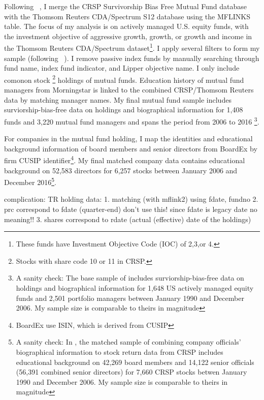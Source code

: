 \documentclass[11pt]{article}
\begin{document}
\begin{doublespace}
Following ~\cite{wermers2000mutual}, I merge the CRSP Survivorship Bias Free Mutual Fund database with the Thomsom Reuters CDA/Spectrum S12 database using the MFLINKS table. The focus of my analysis is on actively managed U.S. equity funds, with the investment objective of aggressive growth, growth, or growth and income in the Thomsom Reuters CDA/Spectrum dataset\footnote{These funds have Investment Objective Code (IOC) of 2,3,or 4.}. 
I apply several filters to form my sample (following ~\cite{kacperczyk2006unobserved}). I remove passive index funds by manually searching through fund name, index fund indicator, and Lipper objective name. I only include comonon stock \footnote{Stocks with share code 10 or 11 in CRSP. } holdings of mutual funds. Education history of mutual fund managers from Morningstar is linked to the combined CRSP/Thomsom Reuters data by matching manager names. My final mutual fund sample includes surviorship-bias-free data on holdings and biographical information for 1,408 funds and 3,220 mutual fund managers and spans the period from 2006 to 2016 \footnote{A sanity check: The base sample of \cite{Cohen2008} includes surviorship-bias-free data on holdings and biographical information for 1,648 US actively managed equity funds and 2,501 portfolio managers between January 1990 and December 2006. My sample size is comparable to theirs in magnitude}.

For companies in the mutual fund holding, I map the identities and educational background information of board members and senior directors from BoardEx by firm CUSIP identifier\footnote{BoardEx use ISIN, which is derived from CUSIP}. My final matched company data contains educational background on 52,583 directors for 6,257 stocks between January 2006 and December 2016\footnote{A sanity check: In \cite{Cohen2008}, the matched sample of combining company officials' biographical information to stock return data from CRSP includes educational background on 42,269 board members and 14,122 senior officials (56,391 combined senior directors) for 7,660 CRSP stocks betwen January 1990 and December 2006. My sample size is comparable to theirs in magnitude}.


\newpage
complication:
TR holding data:
1. matching (with mflink2) using fdate, fundno
2. prc correspond to fdate (quarter-end) don't use this! since fdate is legacy date no meaning!!
3. shares correspond to rdate (actual (effective) date of the holdings)

\clearpage

\appendix


\end{doublespace}
\end{document}

